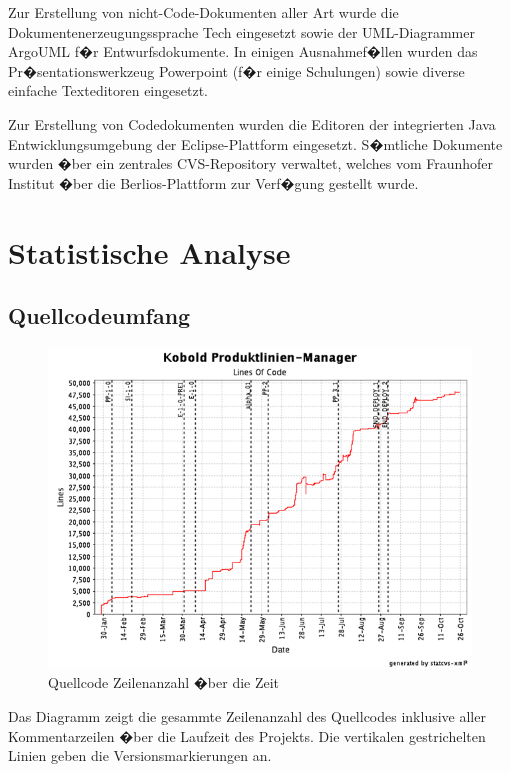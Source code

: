 \documentclass[a4paper,titlepage,12pt,ngerman]{scrbook}
\begin{document}
Zur Erstellung von nicht-Code-Dokumenten aller Art wurde die Dokumentenerzeugungssprache
Tech eingesetzt sowie der UML-Diagrammer ArgoUML f�r Entwurfsdokumente. In einigen
Ausnahmef�llen wurden das Pr�sentationswerkzeug Powerpoint (f�r einige Schulungen) sowie
diverse einfache Texteditoren eingesetzt.\par

Zur Erstellung von Codedokumenten wurden die Editoren der integrierten Java Entwicklungsumgebung 
der Eclipse-Plattform eingesetzt. S�mtliche Dokumente wurden �ber ein zentrales CVS-Repository 
verwaltet, welches vom Fraunhofer Institut �ber die Berlios-Plattform zur Verf�gung gestellt wurde.

\chapter{Statistische Analyse}


\section{Quellcodeumfang}

\begin{figure}[h!]
  \centering
  \includegraphics[width=15cm]{praesentation/lines_of_code}
  \caption{Quellcode Zeilenanzahl �ber die Zeit}
\end{figure}

Das Diagramm zeigt die gesammte Zeilenanzahl des Quellcodes inklusive
aller Kommentarzeilen �ber die Laufzeit des Projekts. Die vertikalen
gestrichelten Linien geben die Versionsmarkierungen an.\par
\end{document}

